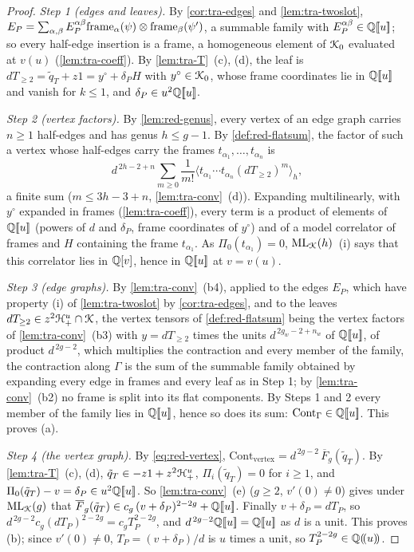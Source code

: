 \begin{proof}
\emph{Step 1 (edges and leaves).} By \cref{cor:tra-edges} and \cref{lem:tra-twoslot}, $E_P = \sum_{\alpha,\beta}E_P^{\alpha\beta}\mathrm{frame}_\alpha(\psi)\otimes\mathrm{frame}_\beta(\psi')$, a summable family with $E_P^{\alpha\beta}\in\mathbb{Q}[\![ u ]\!]$; so every half-edge insertion is a frame, a homogeneous element of $\mathcal{K}_{0}$ evaluated at $v(u)$ (\cref{lem:tra-coeff}). By \cref{lem:tra-T}~(c), (d), the leaf is $dT_{\geq 2} = \tilde q_T+z1 = y^\circ+\delta_PH$ with $y^\circ\in\mathcal{K}_{0}$, whose frame coordinates lie in $\mathbb{Q}[\![ u ]\!]$ and vanish for $k\leq 1$, and $\delta_P\in u^2\mathbb{Q}[\![ u ]\!]$.

\emph{Step 2 (vertex factors).} By \cref{lem:red-genus}, every vertex of an edge graph carries $n\geq 1$ half-edges and has genus $h\leq g-1$. By \cref{def:red-flatsum}, the factor of such a vertex whose half-edges carry the frames $t_{\alpha_1},\dots,t_{\alpha_n}$ is
\[
d^{\,2h-2+n}\sum_{m\geq 0}\frac1{m!}\langle t_{\alpha_1}\cdots t_{\alpha_n}(dT_{\geq 2})^m\rangle_h ,
\]
a finite sum ($m\leq 3h-3+n$, \cref{lem:tra-conv}~(d)). Expanding multilinearly, with $y^\circ$ expanded in frames (\cref{lem:tra-coeff}), every term is a product of elements of $\mathbb{Q}[\![ u ]\!]$ (powers of $d$ and $\delta_P$, frame coordinates of $y^\circ$) and of a model correlator of frames and $H$ containing the frame $t_{\alpha_1}$. As $\Pi_0(t_{\alpha_1}) = 0$, $\mathrm{ML}_{\mathcal{K}}(h)$~(i) says that this correlator lies in $\mathbb{Q}[v]$, hence in $\mathbb{Q}[\![ u ]\!]$ at $v = v(u)$.

\emph{Step 3 (edge graphs).} By \cref{lem:tra-conv}~(b4), applied to the edges $E_P$, which have property (i) of \cref{lem:tra-twoslot} by \cref{cor:tra-edges}, and to the leaves $dT_{\geq 2}\in z^2\mathcal{H}^u_+\cap\mathcal{K}$, the vertex tensors of \cref{def:red-flatsum} being the vertex factors of \cref{lem:tra-conv}~(b3) with $y=dT_{\geq2}$ times the units $d^{\,2g_w-2+n_w}$ of $\mathbb{Q}[\![ u ]\!]$, of product $d^{\,2g-2}$, which multiplies the contraction and every member of the family, the contraction along $\Gamma$ is the sum of the summable family obtained by expanding every edge in frames and every leaf as in Step 1; by \cref{lem:tra-conv}~(b2) no frame is split into its flat components. By Steps 1 and 2 every member of the family lies in $\mathbb{Q}[\![ u ]\!]$, hence so does its sum: $\mathrm{Cont}_\Gamma\in\mathbb{Q}[\![ u ]\!]$. This proves (a).

\emph{Step 4 (the vertex graph).} By \eqref{eq:red-vertex}, $\mathrm{Cont}_{\mathrm{vertex}} = d^{\,2g-2}\,\overline F_g(\tilde q_T)$. By \cref{lem:tra-T}~(c), (d), $\tilde q_T\in -z1+z^2\mathcal{H}^u_+$, $\Pi_i(\tilde q_T) = 0$ for $i\geq 1$, and $\Pi_0(\tilde q_T)-v = \delta_P\in u^2\mathbb{Q}[\![ u ]\!]$. So \cref{lem:tra-conv}~(e) ($g\geq 2$, $v'(0)\neq 0$) gives under $\mathrm{ML}_{\mathcal{K}}(g)$ that $\overline F_g(\tilde q_T)\in c_g\,(v+\delta_P)^{2-2g}+\mathbb{Q}[\![ u ]\!]$. Finally $v+\delta_P = dT_P$, so $d^{\,2g-2}c_g(dT_P)^{2-2g} = c_gT_P^{2-2g}$, and $d^{\,2g-2}\mathbb{Q}[\![ u ]\!] = \mathbb{Q}[\![ u ]\!]$ as $d$ is a unit. This proves (b); since $v'(0)\neq 0$, $T_P = (v+\delta_P)/d$ is $u$ times a unit, so $T_P^{2-2g}\in\mathbb{Q}(\!(u)\!)$.
\end{proof}

